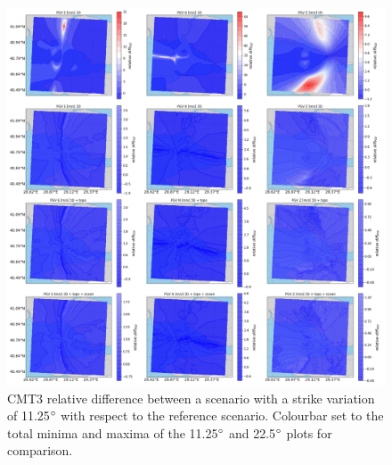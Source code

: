 \documentclass[../Text/00main.tex]{subfiles}
\begin{document}
\begin{figure}[!h]
    \centering
    \includegraphics[width=1\linewidth]{images_results/strike_variation_epsilon12_sc3.png}
    \caption{CMT3 relative difference between a scenario with a strike variation of 11.25$\degree$ with respect to the reference scenario. Colourbar set to the total minima and maxima of the 11.25$\degree$ and 22.5$\degree$ plots for comparison.}
    \label{fig:ref_eps12-2}
\end{figure}
\end{document}
